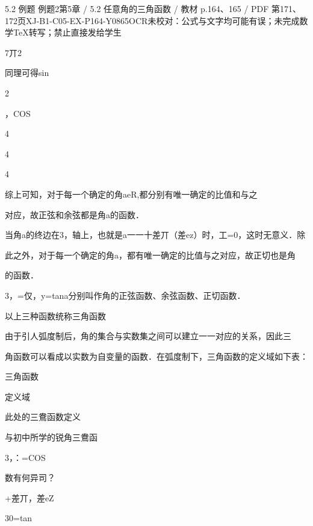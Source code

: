 \begin{bankitem}{5.2 例题 例题2}{第5章 / 5.2 任意角的三角函数 / 教材 p.164、165 / PDF 第171、172页}{XJ-B1-C05-EX-P164-Y0865}{OCR未校对：公式与文字均可能有误；未完成数学TeX转写；禁止直接发给学生}
\begin{ocrdraft}
7丌2
\par
同理可得sin
\par
2
\par
，COS
\par
4
\par
4
\par
4
\par
综上可知，对于每一个确定的角aeR,都分别有唯一确定的比值和与之
\par
对应，故正弦和余弦都是角a的函数．
\par
当角a的终边在3，轴上，也就是a一一十差丌（差ez）时，工=0，这时无意义．除
\par
[教材p.165 / PDF第172页]
\par
此之外，对于每一个确定的角a，都有唯一确定的比值与之对应，故正切也是角
\par
的函数．
\par
3，=仅，y=tana分别叫作角的正弦函数、余弦函数、正切函数．
\par
以上三种函数统称三角函数
\par
由于引人弧度制后，角的集合与实数集之间可以建立一一对应的关系，因此三
\par
角函数可以看成以实数为自变量的函数．在弧度制下，三角函数的定义域如下表：
\par
三角函数
\par
定义域
\par
此处的三鴦函数定义
\par
与初中所学的锐角三鴦函
\par
3，：=COS
\par
数有何异司？
\par
+差丌，差eZ
\par
30=tan
\end{ocrdraft}
\end{bankitem}

